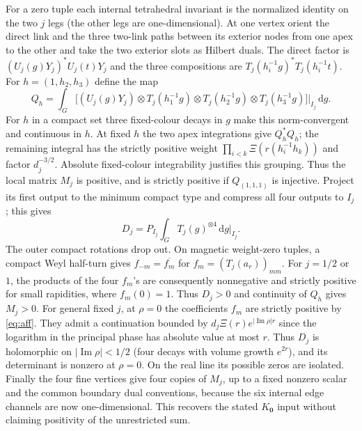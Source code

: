 \documentclass[11pt]{article}
\theoremstyle{remark}
\newcommand{\dd}{\mathrm d}
\begin{document}
For a zero tuple each internal tetrahedral invariant is the normalized identity on the two \(j\) legs (the other legs are one-dimensional). At one vertex orient the direct link and the three two-link paths between its exterior nodes from one apex to the other and take the two exterior slots as Hilbert duals. The direct factor is \((U_j(g)Y_j)^*U_j(t)Y_j\) and the three compositions are \(T_j(h_i^{-1}g)^*T_j(h_i^{-1}t)\). For \(h=(1,h_2,h_3)\) define the map
\[
 Q_h=\int_G \big[(U_j(g)Y_j)\otimes T_j(h_1^{-1}g)\otimes
             T_j(h_2^{-1}g)\otimes T_j(h_3^{-1}g)\big]\big|_{I_j}\,\dd g .
\]
For \(h\) in a compact set three fixed-colour decays in \(g\) make this norm-convergent and continuous in \(h\). At fixed \(h\) the two apex integrations give \(Q_h^*Q_h\); the remaining integral has the strictly positive weight \(\prod_{i<k}\Xi(r(h_i^{-1}h_k))\) and factor \(d_j^{-3/2}\). Absolute fixed-colour integrability justifies this grouping. Thus the local matrix \(M_j\) is positive, and is strictly positive if \(Q_{(1,1,1)}\) is injective. Project its first output to the minimum compact type and compress all four outputs to \(I_j\); this gives
\[
 D_j=P_{I_j}\int_G T_j(g)^{\otimes4}\,\dd g\big|_{I_j}.
\]
The outer compact rotations drop out. On magnetic weight-zero tuples, a compact Weyl half-turn gives \(f_{-m}=\overline{f_m}\) for \(f_m=(T_j(a_r))_{mm}\). For \(j=1/2\) or \(1\), the products of the four \(f_m\)'s are consequently nonnegative and strictly positive for small rapidities, where \(f_m(0)=1\). Thus \(D_j>0\) and continuity of \(Q_h\) gives \(M_j>0\). For general fixed \(j\), at \(\rho=0\) the coefficients \(f_m\) are strictly positive by \eqref{eq:aff}. They admit a continuation bounded by \(d_j\Xi(r)e^{|\operatorname{Im}\rho|r}\) since the logarithm in the principal phase has absolute value at most \(r\). Thus \(D_j\) is holomorphic on \(|\operatorname{Im}\rho|<1/2\) (four decays with volume growth \(e^{2r}\)), and its determinant is nonzero at \(\rho=0\). On the real line its possible zeros are isolated. Finally the four fine vertices give four copies of \(M_j\), up to a fixed nonzero scalar and the common boundary dual conventions, because the six internal edge channels are now one-dimensional. This recovers the stated \(K_{\boldsymbol 0}\) input without claiming positivity of the unrestricted sum.

\clearpage
\end{document}

